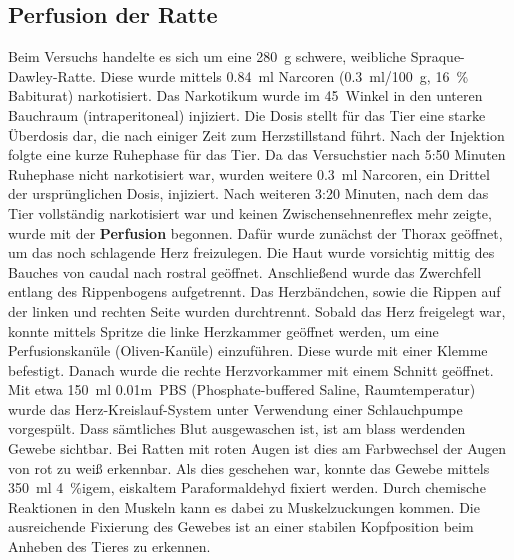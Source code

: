 \documentclass[12pt,a4paper,pdftex]{article}
\begin{document}
\subsection{Perfusion der Ratte}

Beim Versuchs handelte es sich um eine 280~g schwere, weibliche Spraque-Dawley-Ratte. Diese wurde mittels 0.84~ml Narcoren (0.3~ml/100~g, 16~\% Babiturat) narkotisiert. Das Narkotikum wurde im 45\degree~Winkel in den unteren Bauchraum (intraperitoneal) injiziert. Die Dosis stellt für das Tier eine starke Überdosis dar, die nach einiger Zeit zum Herzstillstand führt. Nach der Injektion folgte eine kurze Ruhephase für das Tier. Da das Versuchstier nach 5:50 Minuten Ruhephase nicht narkotisiert war, wurden weitere 0.3~ml Narcoren, ein Drittel der ursprünglichen Dosis, injiziert. Nach weiteren 3:20 Minuten, nach dem das Tier vollständig narkotisiert war und keinen Zwischensehnenreflex mehr zeigte, wurde mit der \textbf{Perfusion} begonnen. Dafür wurde zunächst der Thorax geöffnet, um das noch schlagende Herz freizulegen. Die Haut wurde vorsichtig mittig des Bauches von caudal nach rostral geöffnet. Anschließend wurde das Zwerchfell entlang des Rippenbogens aufgetrennt. Das Herzbändchen, sowie die Rippen auf der linken und rechten Seite wurden durchtrennt. Sobald das Herz freigelegt war, konnte mittels Spritze die linke Herzkammer geöffnet werden, um eine Perfusionskanüle (Oliven-Kanüle) einzuführen. Diese wurde mit einer Klemme befestigt. Danach wurde die rechte Herzvorkammer mit einem Schnitt geöffnet. Mit etwa 150~ml 0.01m~PBS (Phosphate-buffered Saline, Raumtemperatur) wurde das Herz-Kreislauf-System unter Verwendung einer Schlauchpumpe vorgespült. Dass sämtliches Blut ausgewaschen ist, ist am blass werdenden Gewebe sichtbar. Bei Ratten mit roten Augen ist dies am Farbwechsel der Augen von rot zu weiß erkennbar. Als dies geschehen war, konnte das Gewebe mittels 350~ml 4~\%igem, eiskaltem Paraformaldehyd fixiert werden. Durch chemische Reaktionen in den Muskeln kann es dabei zu Muskelzuckungen kommen. Die ausreichende Fixierung des Gewebes ist an einer stabilen Kopfposition beim Anheben des Tieres zu erkennen.
\end{document}
